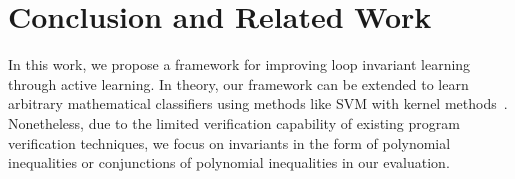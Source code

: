 
\section{Conclusion and Related Work} %
\label{sec:related}
In this work, we propose a framework for improving loop invariant learning through active learning. In theory, our framework can be extended to learn arbitrary mathematical classifiers using methods like SVM with kernel methods~\cite{svm:kernel}. Nonetheless, due to the limited verification capability of existing program verification techniques, we focus on invariants in the form of polynomial inequalities or conjunctions of polynomial inequalities in our evaluation.



